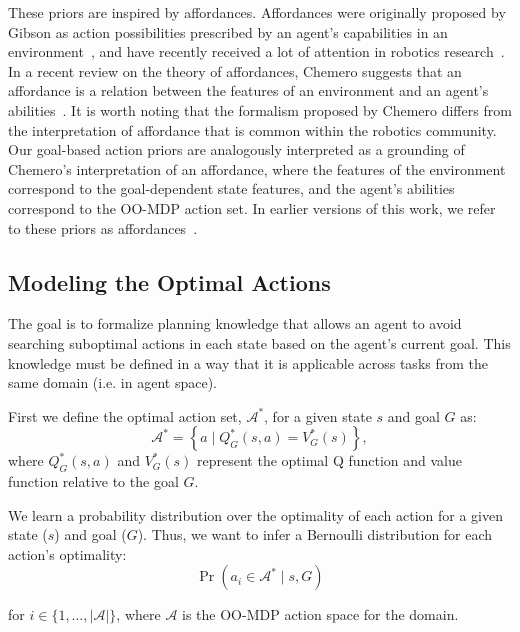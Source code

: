 \documentclass[11pt]{article}
\begin{document}
These priors are inspired by affordances.
Affordances were originally proposed by Gibson as action possibilities
prescribed by an agent's capabilities in an environment~\cite{gibson77}, and have recently
received a lot of attention in robotics research~\cite{koppula13a,koppula13c}. In a recent review on the theory of affordances, Chemero
suggests that an affordance is a relation between the features of an
environment and an agent's abilities~\cite{chemero2003}. It is worth noting that the formalism
proposed by Chemero differs from the interpretation of affordance that is
common within the robotics community. Our goal-based action priors are
analogously interpreted as a grounding of Chemero's interpretation of an affordance,
where the features of the environment correspond to
the goal-dependent state features, and the agent's abilities
correspond to the OO-MDP action set. In earlier versions of this work, we refer to these
priors as affordances~\cite{barth2014affordances,abel2014toward}.

\subsection{Modeling the Optimal Actions}

The goal is to formalize planning knowledge that allows an agent to
avoid searching suboptimal actions in each state based on the agent's
current goal. This knowledge must be defined in a way that it is applicable across tasks from the same domain (i.e. in agent space).

First we define the optimal action set, $\mathcal{A}^*$, for a
given state $s$ and goal $G$ as:
\begin{equation}
\mathcal{A}^* = \left\{ a \mid Q^*_G(s,a) = V^*_G(s) \right\}, 
\label{eq:opt_act_set}
\end{equation}
where $Q^*_G(s,a)$ and $V^*_G(s)$ represent the optimal Q function and 
value function relative to the goal $G$.

We learn a probability distribution over the optimality of each action
for a given state ($s$) and goal ($G$). Thus, we want to infer a Bernoulli
distribution for each action's optimality:
\begin{equation}
\Pr(a_i \in \mathcal{A}^* \mid s, G)
\label{eq:master}
\end{equation}

\noindent for $i \in \{1, \ldots, |\mathcal{A}|\}$, where
$\mathcal{A}$ is the OO-MDP action space for the domain.
\end{document}

